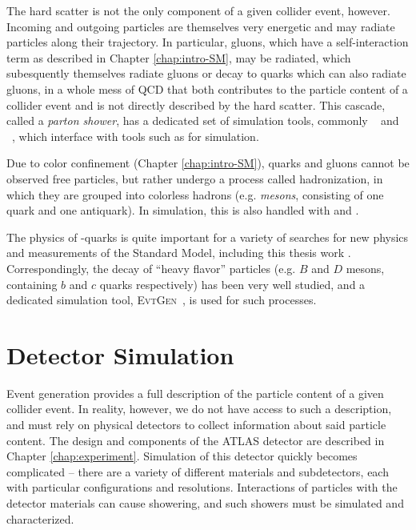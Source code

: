 The hard scatter is not the only component of a given collider event, however. Incoming and outgoing 
particles are themselves very energetic and may radiate particles along their trajectory. In particular,
gluons, which have a self-interaction term as described in Chapter \ref{chap:intro-SM}, may be radiated,  
which subesquently themselves radiate gluons or decay to quarks which can also radiate gluons, in a 
whole mess of QCD that both contributes to the particle content of a collider event and is not directly 
described by the hard scatter. This cascade, called a \emph{parton shower}, has a dedicated set of simulation
tools, commonly \HERWIG[7]~\cite{Herwig7}\cite{HerwigPP} and \PYTHIA[8]~\cite{Pythia}, which interface with 
tools such as \MADGRAPH for simulation. 

Due to color confinement (Chapter \ref{chap:intro-SM}), quarks and gluons cannot be observed free particles, but 
rather undergo a process called hadronization, in which they are grouped into colorless hadrons (e.g. \emph{mesons},
consisting of one quark and one antiquark). In simulation, this is also handled with \HERWIG[7] and \PYTHIA[8].

The physics of \Pqb-quarks is quite important for a variety of searches for new physics and measurements of 
the Standard Model, including this thesis work . Correspondingly, the decay of ``heavy flavor'' particles 
(e.g. $B$ and $D$ mesons, containing $b$ and $c$ quarks respectively) has been very well studied, and 
a dedicated simulation tool, \textsc{EvtGen}~\cite{EvtGen}, is used for such processes.


\section{Detector Simulation}
Event generation provides a full description of the particle content of a given collider event. In reality, however, we 
do not have access to such a description, and must rely on physical detectors to collect information about said particle 
content. The design and components of the ATLAS detector are described in Chapter \ref{chap:experiment}. 
Simulation of this detector quickly becomes complicated -- there are a variety of different materials and subdetectors, each with particular configurations and resolutions. Interactions of particles with the detector materials can cause showering, and such showers must be simulated and characterized. 

